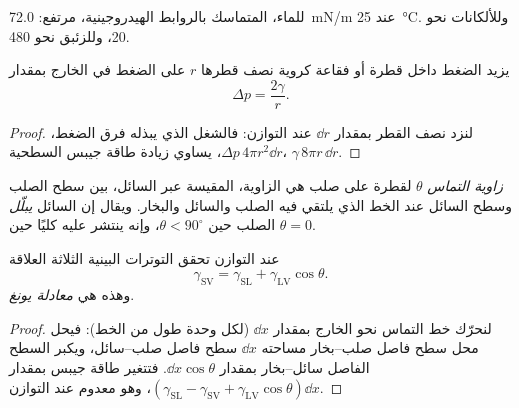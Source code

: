 للماء، المتماسك بالروابط الهيدروجينية،  مرتفع: \qty{72.0}{mN/m}
عند \qty{25}{\celsius}. وللألكانات نحو 20، وللزئبق نحو 480.

\begin{proposition}\label{prop:b3:colloids:laplace}
يزيد الضغط داخل قطرة أو فقاعة كروية نصف قطرها $r$ على
الضغط في الخارج بمقدار
\[
  \Delta p = \frac{2\gamma}{r} .
\]
\end{proposition}

\begin{proof}
لنزد نصف القطر بمقدار $\dd r$ عند التوازن: فالشغل الذي يبذله فرق
الضغط، $\Delta p\,4\pi r^2\dd r$، يساوي زيادة طاقة جيبس السطحية، $\gamma\,8\pi r\,\dd r$.
\end{proof}

\begin{definition}\label{def:b3:colloids:wetting}
\emph{زاوية التماس} $\theta$ لقطرة على صلب هي الزاوية،
المقيسة عبر السائل، بين سطح الصلب وسطح السائل
عند الخط الذي يلتقي فيه الصلب والسائل والبخار. ويقال إن السائل \emph{يبلّل}
الصلب حين $\theta < 90^\circ$، وإنه ينتشر عليه كليًا حين $\theta = 0$.
\end{definition}

\begin{theorem}\label{thm:b3:colloids:young}
عند التوازن تحقق التوترات البينية الثلاثة  العلاقة
\[
  \gamma_{\mathrm{SV}} = \gamma_{\mathrm{SL}} + \gamma_{\mathrm{LV}}\cos\theta .
\]
وهذه هي \emph{معادلة يونغ}.
\end{theorem}

\begin{proof}
لنحرّك خط التماس نحو الخارج بمقدار $\dd x$ (لكل وحدة طول من الخط): فيحل محل سطح
فاصل صلب--بخار مساحته $\dd x$ سطح فاصل صلب--سائل، ويكبر السطح الفاصل
سائل--بخار بمقدار $\dd x\cos\theta$. فتتغير طاقة جيبس بمقدار
$(\gamma_{\mathrm{SL}} - \gamma_{\mathrm{SV}} + \gamma_{\mathrm{LV}}\cos\theta)\dd x$، وهو معدوم عند التوازن.
\end{proof}

